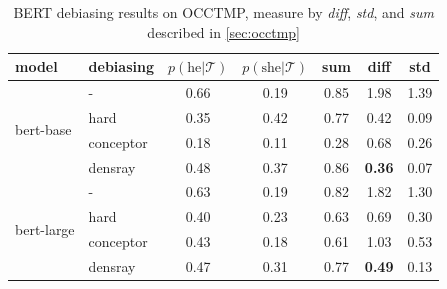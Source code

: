 \begin{table}[ht]
\centering
\footnotesize
\vspace{0cm}  
\setlength{\abovecaptionskip}{0.2cm}   
\setlength{\belowcaptionskip}{0cm}
\begin{tabular}{llccccc}
	\toprule
	model & debiasing &$p(\text{he} | {\mathcal T})$ & $p(\text{she} | {\mathcal T})$& sum & diff & std\\
	\midrule
	\multirow{4}{2cm}{bert-base} & - & 0.66 & 0.19 & 0.85 &1.98&1.39\\
	&hard & 0.35 & 0.42 & 0.77&0.42&0.09\\
	&conceptor & 0.18 & 0.11 & 0.28 & 0.68&0.26\\
	&densray & 0.48 & 0.37 & 0.86&\textbf{0.36}&0.07\\
	\midrule
	\multirow{4}{2cm}{bert-large} & -  & 0.63 & 0.19 & 0.82  &1.82&1.30\\
	&hard & 0.40 & 0.23 & 0.63&0.69&0.30\\
	&conceptor & 0.43 & 0.18 & 0.61 & 1.03&0.53\\
	&densray  & 0.47 & 0.31 & 0.77&\textbf{0.49}&0.13 \\
	\bottomrule
\end{tabular}
\caption{ BERT debiasing results on OCCTMP, measure by \textit{diff}, \textit{std}, and \textit{sum} described in \ref{sec:occtmp}}

\vspace{0.4cm}


\end{table}
